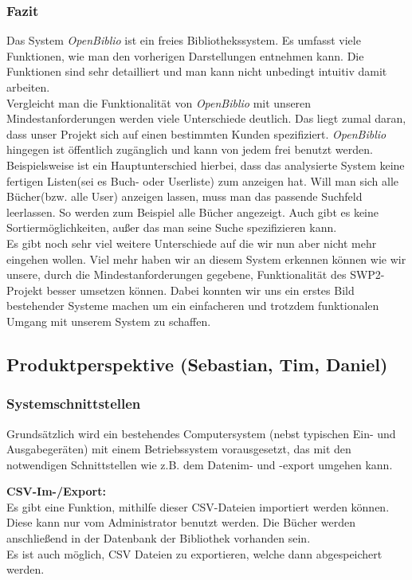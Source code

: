 \documentclass[fontsize=12pt,paper=a4,twoside]{scrartcl}
\begin{document}
\subsubsection*{Fazit}
Das System \emph{OpenBiblio} ist ein freies Bibliothekssystem. Es umfasst viele Funktionen, wie man den vorherigen Darstellungen entnehmen kann. Die Funktionen sind sehr detailliert und man kann nicht unbedingt intuitiv damit arbeiten.\\
Vergleicht man die Funktionalität von \emph{OpenBiblio} mit unseren Mindestanforderungen werden viele Unterschiede deutlich. Das liegt zumal daran, dass unser Projekt sich auf einen bestimmten Kunden spezifiziert. \emph{OpenBiblio} hingegen ist öffentlich zugänglich und kann von jedem frei benutzt werden.\\
Beispielsweise ist ein Hauptunterschied hierbei, dass das analysierte System keine fertigen Listen(sei es Buch- oder Userliste) zum anzeigen hat. Will man sich alle Bücher(bzw. alle User) anzeigen lassen, muss man das passende Suchfeld leerlassen. So werden zum Beispiel alle Bücher angezeigt. Auch gibt es keine Sortiermöglichkeiten, außer das man seine Suche spezifizieren kann.\\
Es gibt noch sehr viel weitere Unterschiede auf die wir nun aber nicht mehr eingehen wollen. Viel mehr haben wir an diesem System erkennen können wie wir unsere, durch die Mindestanforderungen gegebene, Funktionalität des SWP2-Projekt besser umsetzen können. Dabei konnten wir uns ein erstes Bild bestehender Systeme machen um ein einfacheren und trotzdem funktionalen Umgang mit unserem System zu schaffen.

\subsection{Produktperspektive (Sebastian, Tim, Daniel)}
  
\subsubsection{Systemschnittstellen}


  Grundsätzlich wird ein bestehendes Computersystem (nebst typischen Ein- und Ausgabegeräten) 
  mit einem Betriebssystem vorausgesetzt, das mit den notwendigen Schnittstellen wie z.B. dem 
  Datenim- und -export umgehen kann.
  
  \textbf{CSV-Im-/Export:}\\
  Es gibt eine Funktion, mithilfe dieser CSV-Dateien importiert werden können. Diese kann nur vom 
  Administrator benutzt werden. Die Bücher werden anschließend in der Datenbank der Bibliothek 
  vorhanden sein. \\
  Es ist auch möglich, CSV Dateien zu exportieren, welche dann abgespeichert werden.
\end{document}
